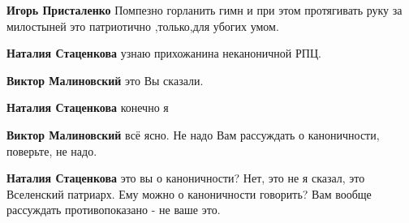 \begin{itemize}
\begin{itemize}
 
\textbf{Игорь Присталенко} Помпезно горланить гимн и при этом протягивать руку за милостыней это патриотично ,только,для убогих умом.

 
\textbf{Наталия Стаценкова} узнаю прихожанина неканоничной РПЦ.

 
\textbf{Виктор Малиновский} это Вы сказали.

 
\textbf{Наталия Стаценкова} конечно я

 
\textbf{Виктор Малиновский} всё ясно. Не надо Вам рассуждать о каноничности, поверьте, не надо.

 
\textbf{Наталия Стаценкова} это вы о каноничности? Нет, это не я сказал, это
Вселенский патриарх. Ему можно о каноничности говорить? Вам вообще рассуждать
противопоказано - не ваше это.


\end{itemize}
\end{itemize}
